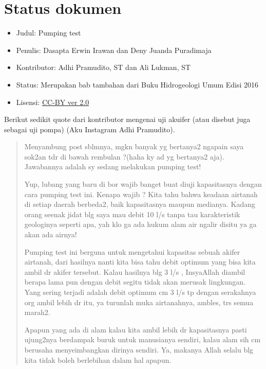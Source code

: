 \section{Status dokumen}

\begin{itemize}
\item Judul: Pumping test
\end{itemize}
\begin{itemize}
\item Penulis: Dasapta Erwin Irawan dan Deny Juanda Puradimaja
\end{itemize}
\begin{itemize}
\item Kontributor: Adhi Pramudito, ST dan Ali Lukman, ST
\end{itemize}
\begin{itemize}
\item Status: Merupakan bab tambahan dari Buku Hidrogeologi Umum Edisi 2016
\end{itemize}
\begin{itemize}
\item Lisensi: \href{http://creativecommons.org/licenses/by/2.0/}{CC-BY ver 2.0}
\end{itemize}

Berikut sedikit quote dari kontributor mengenai uji akuifer (atau disebut juga sebagai uji pompa) (Aku Instagram Adhi Pramudito).

\begin{quote}
Menyambung post sblmnya, mgkn banyak yg bertanya2 ngapain saya sok2an tdr di bawah rembulan ?(haha ky ad yg bertanya2 aja). Jawabannya adalah sy sedang melakukan pumping test! 

Yup, lubang yang baru di bor wajib banget buat diuji kapasitasnya dengan cara pumping test ini. Kenapa wajib ? Kita tahu bahwa keadaan airtanah di setiap daerah berbeda2, baik kapasitasnya maupun medianya. Kadang orang seenak jidat blg saya mau debit 10 l/s tanpa tau karakteristik geologinya seperti apa, yah klo ga ada hukum alam air ngalir disitu ya ga akan ada airnya!

Pumping test ini berguna untuk mengetahui kapasitas sebuah akifer airtanah, dari hasilnya nanti kita bisa tahu debit optimum yang bisa kita ambil dr akifer tersebut. Kalau hasilnya blg 3 l/s , InsyaAllah diambil berapa lama pun dengan debit segitu tidak akan merusak lingkungan. Yang sering terjadi adalah debit optimum cm 3 l/s tp dengan serakahnya org ambil lebih dr itu, ya turunlah muka airtanahnya, ambles, trs semua marah2.

Apapun yang ada di alam kalau kita ambil lebih dr kapasitasnya pasti ujung2nya berdampak buruk untuk manusianya sendiri, kalau alam sih cm berusaha menyeimbangkan dirinya sendiri. Ya, makanya Allah selalu blg kita tidak boleh berlebihan dalam hal apapun.
\end{quote}